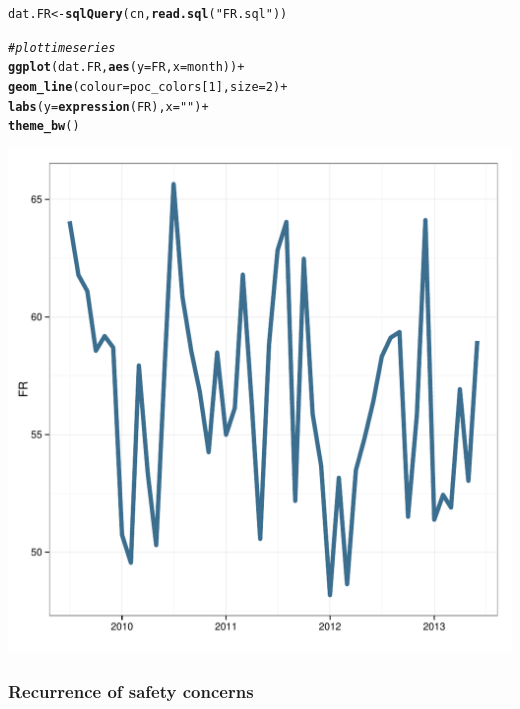 \documentclass[12pt]{article}\usepackage[]{graphicx}\usepackage[]{color}
\makeatletter
\def\maxwidth{ %
  \ifdim\Gin@nat@width>\linewidth
    \linewidth
  \else
    \Gin@nat@width
  \fi
}
\newcommand{\hlnum}[1]{\textcolor[rgb]{0.686,0.059,0.569}{#1}}%
\newcommand{\hlstr}[1]{\textcolor[rgb]{0.192,0.494,0.8}{#1}}%
\newcommand{\hlcom}[1]{\textcolor[rgb]{0.678,0.584,0.686}{\textit{#1}}}%
\newcommand{\hlopt}[1]{\textcolor[rgb]{0,0,0}{#1}}%
\newcommand{\hlstd}[1]{\textcolor[rgb]{0.345,0.345,0.345}{#1}}%
\newcommand{\hlkwb}[1]{\textcolor[rgb]{0.69,0.353,0.396}{#1}}%
\newcommand{\hlkwc}[1]{\textcolor[rgb]{0.333,0.667,0.333}{#1}}%
\newcommand{\hlkwd}[1]{\textcolor[rgb]{0.737,0.353,0.396}{\textbf{#1}}}%
\newenvironment{kframe}{%
 \def\at@end@of@kframe{}%
 \ifinner\ifhmode%
  \def\at@end@of@kframe{\end{minipage}}%
  \begin{minipage}{\columnwidth}%
 \fi\fi%
 \def\FrameCommand##1{\hskip\@totalleftmargin \hskip-\fboxsep
 \colorbox{shadecolor}{##1}\hskip-\fboxsep
     \hskip-\linewidth \hskip-\@totalleftmargin \hskip\columnwidth}%
 \MakeFramed {\advance\hsize-\width
   \@totalleftmargin\z@ \linewidth\hsize
   \@setminipage}}%
 {\par\unskip\endMakeFramed%
 \at@end@of@kframe}
\newenvironment{knitrout}{}{} %
\makeatother
\begin{document}
\begin{knitrout}
\color{fgcolor}\begin{kframe}
\begin{alltt}
\hlstd{dat.FR} \hlkwb{<-} \hlkwd{sqlQuery}\hlstd{(cn,} \hlkwd{read.sql}\hlstd{(}\hlstr{"FR.sql"}\hlstd{))}

\hlcom{#plot time series}
\hlkwd{ggplot}\hlstd{(dat.FR,} \hlkwd{aes}\hlstd{(}\hlkwc{y}\hlstd{=FR,} \hlkwc{x}\hlstd{=month))} \hlopt{+}
  \hlkwd{geom_line}\hlstd{(}\hlkwc{colour}\hlstd{=poc_colors[}\hlnum{1}\hlstd{],} \hlkwc{size}\hlstd{=}\hlnum{2}\hlstd{)} \hlopt{+}
  \hlkwd{labs}\hlstd{(}\hlkwc{y} \hlstd{=} \hlkwd{expression}\hlstd{(FR),} \hlkwc{x} \hlstd{=} \hlstr{""}\hlstd{)} \hlopt{+}
  \hlkwd{theme_bw}\hlstd{()}
\end{alltt}
\end{kframe}

{\centering \includegraphics[width=\maxwidth]{figure/FR} 

}



\end{knitrout}


\subsubsection{Recurrence of safety concerns}
\end{document}
